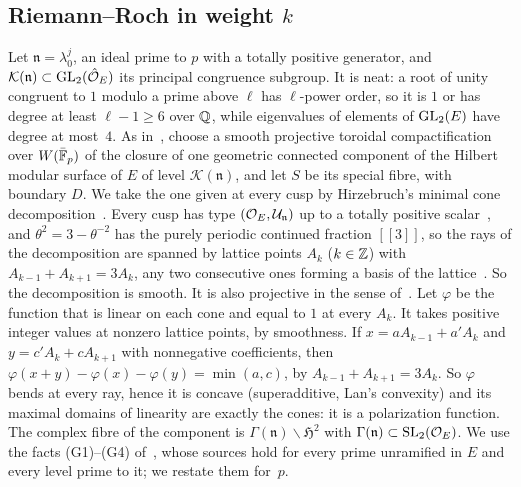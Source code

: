 \subsection{Riemann--Roch in weight \texorpdfstring{$k$}{k}}\label{sec:arith-RR}

Let $\mathfrak n=\lambda_0^j$, an ideal prime to $p$ with a totally positive generator, and
$\mathcal K(\mathfrak n)\subset\operatorname{GL}_2(\hat{\mathcal{O}}_E)$ its principal congruence subgroup. It is neat: a root of unity congruent
to $1$ modulo a prime above $\ell$ has $\ell$-power order, so it is $1$ or has degree at least $\ell-1\ge6$ over $\mathbb{Q}$,
while eigenvalues of elements of $\operatorname{GL}_2(E)$ have degree at most~$4$. As in~\cite[Section~6.2]{Luck2026}, choose a smooth
projective toroidal compactification over $W(\bar{\mathbb{F}}_p)$ of the closure of one geometric connected component of the
Hilbert modular surface of $E$ of level $\mathcal K(\mathfrak n)$, and let $S$ be its special fibre, with boundary $D$.
We take the one given at every cusp by Hirzebruch's minimal cone decomposition~\cite[Section~2.5]{Hirzebruch1973}. Every
cusp has type $(\mathcal{O}_E,\mathcal U_{\mathfrak n})$ up to a totally positive scalar~\cite[Section~6.2, (G4)]{Luck2026}, and
$\theta^2=3-\theta^{-2}$ has the purely periodic continued fraction $[[3]]$, so the rays of the decomposition are spanned by
lattice points $A_k$ ($k\in\mathbb{Z}$) with $A_{k-1}+A_{k+1}=3A_k$, any two consecutive ones forming a basis of the
lattice~\cite[Sections~2.5 and~2.6]{Hirzebruch1973}. So the decomposition is smooth. It is also projective in the sense
of~\cite[Definitions~7.3.1.1 and~7.3.1.3]{Lan2013}. Let $\varphi$ be the function that is linear on each cone and equal
to $1$ at every $A_k$. It takes positive integer values at nonzero lattice points, by smoothness. If
$x=aA_{k-1}+a'A_k$ and $y=c'A_k+cA_{k+1}$ with nonnegative coefficients, then
$\varphi(x+y)-\varphi(x)-\varphi(y)=\min(a,c)$, by $A_{k-1}+A_{k+1}=3A_k$. So $\varphi$ bends at every ray, hence it is
concave (superadditive, Lan's convexity) and its maximal domains of linearity are exactly the cones: it is a
polarization function. The complex fibre of the component is $\Gamma(\mathfrak n)\backslash\mathfrak H^2$ with
$\Gamma(\mathfrak n)\subset\operatorname{SL}_2(\mathcal{O}_E)$. We use the facts (G1)--(G4) of~\cite[Section~6.2]{Luck2026}, whose sources hold
for every prime unramified in $E$ and every level prime to it; we restate them for~$p$.
